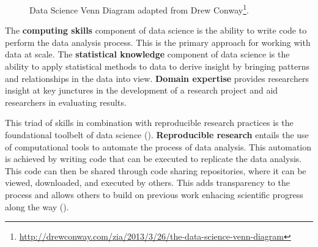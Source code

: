 \documentclass[
  letterpaper,
  DIV=11,
  numbers=noendperiod]{scrreprt}
\theoremstyle{definition}
\theoremstyle{remark}
\DeclareRobustCommand{\href}[2]{#2\footnote{\url{#1}}}
\begin{document}
\begin{figure}[H]


\caption{\label{fig-intro-data-science-venn}Data Science Venn Diagram
adapted from
\href{http://drewconway.com/zia/2013/3/26/the-data-science-venn-diagram}{Drew
Conway}.}

\end{figure}%

The \textbf{computing skills} component of data
science is the ability to write code to perform the data analysis
process. This is the primary approach for working with data at scale.
The \textbf{statistical knowledge}
component of data science is the ability to apply statistical methods to
data to derive insight by bringing patterns and relationships in the
data into view. \textbf{Domain expertise}
provides researchers insight at key junctures in the development of a
research project and aid researchers in evaluating results.

This triad of skills in combination with reproducible research practices
is the foundational toolbelt of data science
(). \textbf{Reproducible
research} entails the use of computational
tools to automate the process of data analysis. This automation is
achieved by writing code that can be executed to replicate the data
analysis. This code can then be shared through code sharing
repositories, where it can be viewed, downloaded, and executed by
others. This adds transparency to the process and allows others to build
on previous work enhacing scientific progress along the way
().
\end{document}
